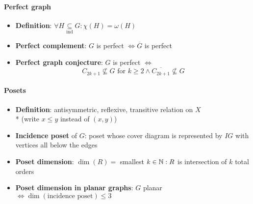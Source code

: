 \paragraph{Perfect graph}
\begin{itemize}
  \item \textbf{Definition}: $ \forall H \underset{\text{ind}}{\subseteq} G : \chi(H) = \omega(H) $
  \item \textbf{Perfect complement}: $ G $ is perfect $ \Leftrightarrow \overline{G} $ is perfect
  \item \textbf{Perfect graph conjecture}: $ G $ is perfect $ \Leftrightarrow $
    \begin{equation*}
      C_{2k+1} \not \subseteq G \text{ for } k \geq 2 \wedge \overline{C_{2k+1}} \not \subseteq G
    \end{equation*}
\end{itemize}

\paragraph{Posets}
\begin{itemize}
  \item \textbf{Definition}: antisymmetric, reflexive, transitive relation on $ X $ \\* (write $ x \leq y $ instead of $ (x,y) $) 
  \item \textbf{Incidence poset} of $ G $: poset whose cover diagram is represented by $ IG $ with vertices all below the edges
  \item \textbf{Poset dimension}: $ \dim(R) = $ smallest $ k \in \mathbb{N} : R $ is intersection of $ k $ total orders
  \item \textbf{Poset dimension in planar graphs}: $ G $ planar $ \Leftrightarrow \dim(\text{incidence poset}) \leq 3 $
\end{itemize}

